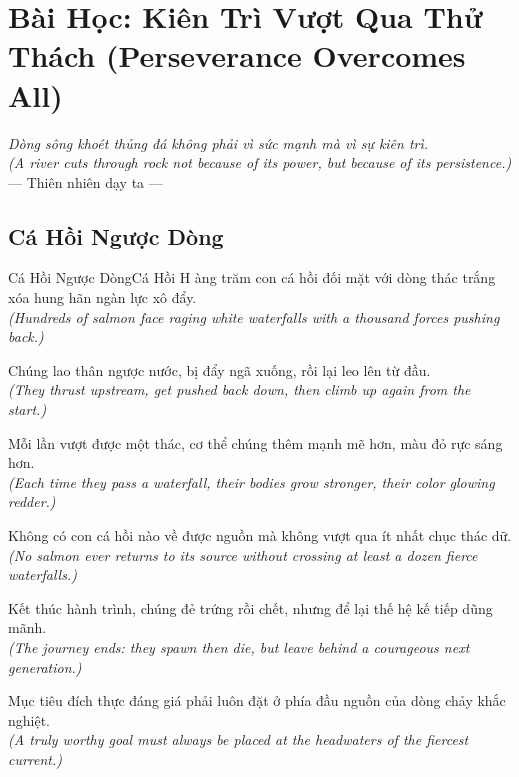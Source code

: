 \chapter{Bài Học: Kiên Trì Vượt Qua Thử Thách (Perseverance Overcomes All)}
\begin{center}
  \textit{\color{truyenblue}Dòng sông khoét thủng đá không phải vì sức mạnh mà vì sự kiên trì.}\\
  \textit{(A river cuts through rock not because of its power, but because of its persistence.)}\\[4pt]
  \small\color{truyengold}--- Thiên nhiên dạy ta ---
\end{center}
\ngancach

\section{Cá Hồi Ngược Dòng}
\begin{truyen}{Cá Hồi Ngược Dòng}{Cá Hồi}
H àng trăm con cá hồi đối mặt với dòng thác trắng xóa hung hãn ngàn lực xô đẩy.\\
\textit{(Hundreds of salmon face raging white waterfalls with a thousand forces pushing back.)}

Chúng lao thân ngược nước, bị đẩy ngã xuống, rồi lại leo lên từ đầu.\\
\textit{(They thrust upstream, get pushed back down, then climb up again from the start.)}

Mỗi lần vượt được một thác, cơ thể chúng thêm mạnh mẽ hơn, màu đỏ rực sáng hơn.\\
\textit{(Each time they pass a waterfall, their bodies grow stronger, their color glowing redder.)}

Không có con cá hồi nào về được nguồn mà không vượt qua ít nhất chục thác dữ.\\
\textit{(No salmon ever returns to its source without crossing at least a dozen fierce waterfalls.)}

Kết thúc hành trình, chúng đẻ trứng rồi chết, nhưng để lại thế hệ kế tiếp dũng mãnh.\\
\textit{(The journey ends: they spawn then die, but leave behind a courageous next generation.)}

\end{truyen}
\begin{baihoc}
  Mục tiêu đích thực đáng giá phải luôn đặt ở phía đầu nguồn của dòng chảy khắc nghiệt.\\
  \textit{(A truly worthy goal must always be placed at the headwaters of the fiercest current.)}
\end{baihoc}

